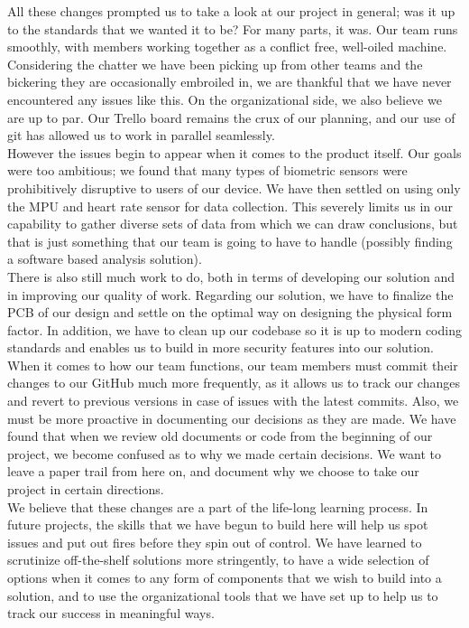 \documentclass[12pt, titlepage]{article}
\begin{document}
All these changes prompted us to take a look at our project in general; was it up to the standards that we wanted it to be? For many parts, it was. Our team runs smoothly, with members working together as a conflict free, well-oiled machine. Considering the chatter we have been picking up from other teams and the bickering they are occasionally embroiled in, we are thankful that we have never encountered any issues like this. On the organizational side, we also believe we are up to par. Our Trello board remains the crux of our planning, and our use of git has allowed us to work in parallel seamlessly.\\

However the issues begin to appear when it comes to the product itself. Our goals were too ambitious; we found that many types of biometric sensors were prohibitively disruptive to users of our device. We have then settled on using only the MPU and heart rate sensor for data collection. This severely limits us in our capability to gather diverse sets of data from which we can draw conclusions, but that is just something that our team is going to have to handle (possibly finding a software based analysis solution).\\

There is also still much work to do, both in terms of developing our solution and in improving our quality of work. Regarding our solution, we have to finalize the PCB of our design and settle on the optimal way on designing the physical form factor. In addition, we have to clean up our codebase so it is up to modern coding standards and enables us to build in more security features into our solution. When it comes to how our team functions, our team members must commit their changes to our GitHub much more frequently, as it allows us to track our changes and revert to previous versions in case of issues with the latest commits. Also, we must be more proactive in documenting our decisions as they are made. We have found that when we review old documents or code from the beginning of our project, we become confused as to why we made certain decisions. We want to leave a paper trail from here on, and document why we choose to take our project in certain directions.\\

We believe that these changes are a part of the life-long learning process. In future projects, the skills that we have begun to build here will help us spot issues and put out fires before they spin out of control. We have learned to scrutinize off-the-shelf solutions more stringently, to have a wide selection of options when it comes to any form of components that we wish to build into a solution, and to use the organizational tools that we have set up to help us to track our success in meaningful ways. \\
\end{document}
